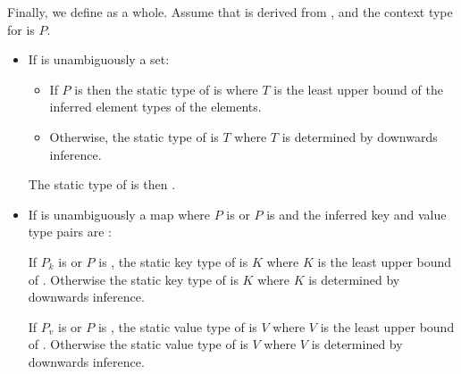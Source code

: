 \documentclass[makeidx]{article}
\begin{document}
{
\vspace{3mm}
\EndCase

\LMHash{}%
Finally, we define
as a whole.
Assume that  is derived from ,
and the context type for  is $P$.

\begin{itemize}
\item
  If  is unambiguously a set:

  \begin{itemize}
  \item
    If $P$ is \FreeContext{} then
    the static type of  is 
    where $T$ is the least upper bound of
    the inferred element types of the elements.
  \item
    Otherwise, the static type of  is $T$
    where $T$ is determined by downwards inference.

  \end{itemize}

  The static type of  is then .
\item
  If  is unambiguously a map
  where $P$ is  or $P$ is \FreeContext{}
  and the inferred key and value type pairs are
  :

  If $P_k$ is \FreeContext{} or $P$ is \FreeContext,
  the static key type of  is $K$
  where $K$ is the least upper bound of .
  Otherwise the static key type of  is $K$
  where $K$ is determined by downwards inference.

  If $P_v$ is \FreeContext{} or $P$ is \FreeContext,
  the static value type of  is $V$
  where $V$ is the least upper bound of .
  Otherwise the static value type of  is $V$
  where $V$ is determined by downwards inference.



\end{itemize}}
\end{document}
